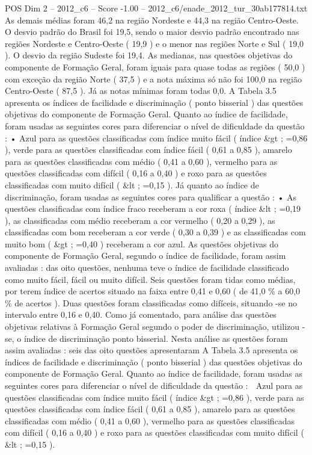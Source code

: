 \begin{textsample}{POS Dim 2 – 2012\_c6 – Score -1.00 – 2012\_c6/enade\_2012\_tur\_30ab177814.txt}
As demais médias foram 46,2 na região Nordeste e 44,3 na região Centro-Oeste.
O desvio padrão do Brasil foi 19,5, sendo o maior desvio padrão encontrado nas regiões Nordeste e Centro-Oeste ( 19,9 ) e o menor nas regiões Norte e Sul ( 19,0 ).
O desvio da região Sudeste foi 19,4.
As medianas, nas questões objetivas do componente de Formação Geral, foram iguais para quase todas as regiões ( 50,0 ) com exceção da região Norte ( 37,5 ) e a nota máxima só não foi 100,0 na região Centro-Oeste ( 87,5 ).
Já as notas mínimas foram todas 0,0.
A Tabela 3.5 apresenta os índices de facilidade e discriminação ( ponto bisserial ) das questões objetivas do componente de Formação Geral.
Quanto ao índice de facilidade, foram usadas as seguintes cores para diferenciar o nível de dificuldade da questão : • Azul para as questões classificadas com índice muito fácil ( índice \&gt ; =0,86 ), verde para as questões classificadas com índice fácil ( 0,61 a 0,85 ), amarelo para as questões classificadas com médio ( 0,41 a 0,60 ), vermelho para as questões classificadas com difícil ( 0,16 a 0,40 ) e roxo para as questões classificadas com muito difícil ( \&lt ; =0,15 ).
Já quanto ao índice de discriminação, foram usadas as seguintes cores para qualificar a questão : • As questões classificadas com índice fraco receberam a cor roxa ( índice \&lt ; =0,19 ), as classificadas com médio receberam a cor vermelho ( 0,20 a 0,29 ), as classificadas com bom receberam a cor verde ( 0,30 a 0,39 ) e as classificadas com muito bom ( \&gt ; =0,40 ) receberam a cor azul.
As questões objetivas do componente de Formação Geral, segundo o índice de facilidade, foram assim avaliadas : das oito questões, nenhuma teve o índice de facilidade classificado como muito fácil, fácil ou muito difícil.
Seis questões foram tidas como médias, por terem índice de acertos situado na faixa entre 0,41 e 0,60 ( de 41,0 \% a 60,0 \% de acertos ).
Duas questões foram classificadas como difíceis, situando -se no intervalo entre 0,16 e 0,40.
Como já comentado, para análise das questões objetivas relativas à Formação Geral segundo o poder de discriminação, utilizou -se, o índice de discriminação ponto bisserial.
Nesta análise as questões foram assim avaliadas : seis das oito questões apresentaram A Tabela 3.5 apresenta os índices de facilidade e discriminação ( ponto bisserial ) das questões objetivas do componente de Formação Geral.
Quanto ao índice de facilidade, foram usadas as seguintes cores para diferenciar o nível de dificuldade da questão :  Azul para as questões classificadas com índice muito fácil ( índice \&gt ; =0,86 ), verde para as questões classificadas com índice fácil ( 0,61 a 0,85 ), amarelo para as questões classificadas com médio ( 0,41 a 0,60 ), vermelho para as questões classificadas com difícil ( 0,16 a 0,40 ) e roxo para as questões classificadas com muito difícil ( \&lt ; =0,15 ).

\end{textsample}
